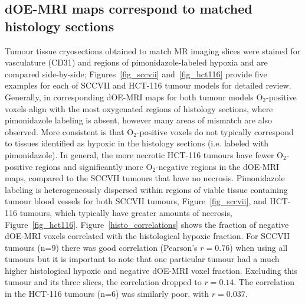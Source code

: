 
\subsection{\acs{dOE-MRI} maps correspond to matched histology sections}
\label{sec:histoSections}
Tumour tissue cryosections obtained to match MR imaging slices were stained for vasculature (\acs{CD31}) and regions of pimonidazole-labeled hypoxia and are compared side-by-side; Figures~\ref{fig_sccvii} and~\ref{fig_hct116} provide five examples for each of SCCVII and HCT-116 tumour models for detailed review.
Generally, in corresponding \acs{dOE-MRI} maps for both tumour models O$_2$-positive voxels align with the most oxygenated regions of histology sections, where pimonidazole labeling is absent, however many areas of mismatch are also observed. 
More consistent is that O$_2$-positive voxels do not typically correspond to tissues identified as hypoxic in the histology sections (i.e. labeled with pimonidazole).
In general, the more necrotic HCT-116 tumours have fewer O$_2$-positive regions and significantly more O$_2$-negative regions in the \acs{dOE-MRI} maps, compared to the SCCVII tumours that have no necrosis. 
Pimonidazole labeling is heterogeneously dispersed within regions of viable tissue containing tumour blood vessels for both SCCVII tumours, Figure~\ref{fig_sccvii}, and HCT-116 tumours, which typically have greater amounts of necrosis, Figure~\ref{fig_hct116}.
Figure~\ref{histo_correlations} shows the fraction of negative \acs{dOE-MRI} voxels correlated with the histological hypoxic fraction. 
For SCCVII tumours (n=9) there was good correlation (Pearson's $r = 0.76$) when using all tumours but it is important to note that one particular tumour had a much higher histological hypoxic and negative \acs{dOE-MRI} voxel fraction.
Excluding this tumour and its three slices, the correlation dropped to $r=0.14$.
The correlation in the HCT-116 tumours (n=6) was similarly poor, with $r=0.037$. 

